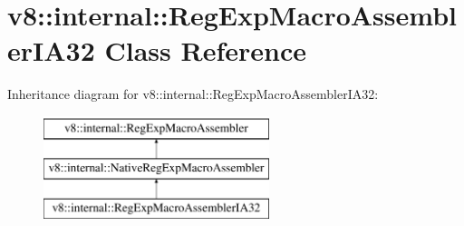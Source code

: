 \hypertarget{classv8_1_1internal_1_1RegExpMacroAssemblerIA32}{}\section{v8\+:\+:internal\+:\+:Reg\+Exp\+Macro\+Assembler\+I\+A32 Class Reference}
\label{classv8_1_1internal_1_1RegExpMacroAssemblerIA32}
Inheritance diagram for v8\+:\+:internal\+:\+:Reg\+Exp\+Macro\+Assembler\+I\+A32\+:\begin{figure}[H]
\begin{center}
\leavevmode
\includegraphics[height=3.000000cm]{classv8_1_1internal_1_1RegExpMacroAssemblerIA32}
\end{center}
\end{figure}
